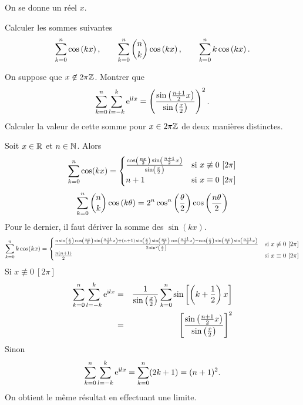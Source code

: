 \documentclass{magnolia}
\begin{document}
On se donne un réel $x$.
\begin{questions}
\question Calculer les sommes suivantes
  $$\sum_{k=0}^n \cos\left(kx\right), \qquad \sum_{k=0}^n \binom{n}{k}\cos\left(kx\right),
    \qquad \sum_{k=0}^n k\cos\left(kx\right).$$
\question 
  \begin{questions}
  \question On suppose que $x\not\in 2\pi\mathbb{Z}$. Montrer que
    $$\sum_{k=0}^{n} \sum_{l=-k}^{k} {\rm e}^{{\rm i} lx}=
      \left(\frac{\sin\left(\frac{n+1}{2}x\right)}{\sin\left(\frac{x}{2}\right)}\right)^2.$$
  \question Calculer la valeur de cette somme pour $x\in 2\pi\mathbb{Z}$ de deux
    manières distinctes.
  \end{questions}
\end{questions}
\begin{sol}
\begin{questions}
\question Soit $x\in\mathbb{R}$ et $n\in\mathbb{N}$. Alors
 \[\sum_{k=0}^n \cos(kx)=\begin{cases}
   \frac{\cos\left(\frac{nx}{2}\right)\sin\left(\frac{n+1}{2}x\right)}{\sin\left(\frac{x}{2}\right)} & \text{si $x\not\equiv 0\ [2\pi]$}\\
   n+1 & \text{si $x\equiv 0\ [2\pi]$}
   \end{cases}\]
\[\sum_{k=0}^n \binom{n}{k}\cos\left(k\theta\right)=2^n \cos^n\left(\frac{\theta}{2}\right)\cos\left(\frac{n\theta}{2}\right)\]
Pour le dernier, il faut dériver la somme des $\sin(kx)$.
\[\sum_{k=0}^n k\cos(kx)=\begin{cases}
  \frac{n\sin\left(\frac{x}{2}\right)\cos\left(\frac{nx}{2}\right)\sin\left(\frac{n+1}{2}x\right)+(n+1)\sin\left(\frac{x}{2}\right)\sin\left(\frac{nx}{2}\right)\cos\left(\frac{n+1}{2}x\right)-\cos\left(\frac{x}{2}\right)\sin\left(\frac{nx}{2}\right)\sin\left(\frac{n+1}{2}x\right)}{2\sin^2\left(\frac{x}{2}\right)} & \text{si $x\not\equiv 0\ [2\pi]$}\\
  \frac{n(n+1)}{2} & \text{si $x\equiv 0\ [2\pi]$}
  \end{cases}\]
\question Si $x\not\equiv 0\ [2\pi]$
  \begin{eqnarray*}
  \sum_{k=0}^n \sum_{l=-k}^k {\rm e}^{{\rm i} lx}
  &=& \frac{1}{\sin\left(\frac{x}{2}\right)}\sum_{k=0}^n \sin\left[\left(k+\frac{1}{2}\right)x\right]\\
  &=& \left[\frac{\sin\left(\frac{n+1}{2}x\right)}{\sin\left(\frac{x}{2}\right)}\right]^2
  \end{eqnarray*}
  Sinon
  \[\sum_{k=0}^n \sum_{l=-k}^k {\rm e}^{{\rm i} lx}=\sum_{k=0}^n (2k+1)=(n+1)^2.\]
  On obtient le même résultat en effectuant une limite.
\end{questions}
\end{sol}

\end{document}

